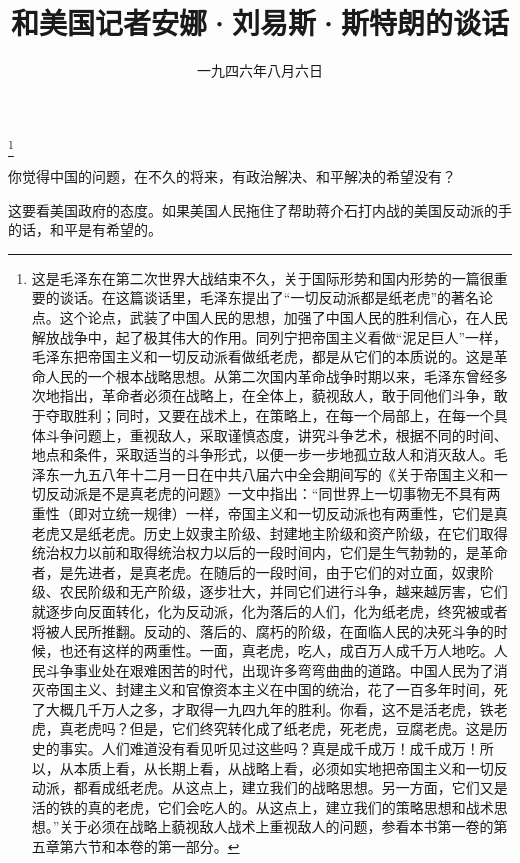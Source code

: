 
\title{和美国记者安娜·刘易斯·斯特朗的谈话}
\date{一九四六年八月六日}
\thanks{这是毛泽东在第二次世界大战结束不久，关于国际形势和国内形势的一篇很重要的谈话。在这篇谈话里，毛泽东提出了“一切反动派都是纸老虎”的著名论点。这个论点，武装了中国人民的思想，加强了中国人民的胜利信心，在人民解放战争中，起了极其伟大的作用。同列宁把帝国主义看做“泥足巨人”一样，毛泽东把帝国主义和一切反动派看做纸老虎，都是从它们的本质说的。这是革命人民的一个根本战略思想。从第二次国内革命战争时期以来，毛泽东曾经多次地指出，革命者必须在战略上，在全体上，藐视敌人，敢于同他们斗争，敢于夺取胜利；同时，又要在战术上，在策略上，在每一个局部上，在每一个具体斗争问题上，重视敌人，采取谨慎态度，讲究斗争艺术，根据不同的时间、地点和条件，采取适当的斗争形式，以便一步一步地孤立敌人和消灭敌人。毛泽东一九五八年十二月一日在中共八届六中全会期间写的《关于帝国主义和一切反动派是不是真老虎的问题》一文中指出：“同世界上一切事物无不具有两重性（即对立统一规律）一样，帝国主义和一切反动派也有两重性，它们是真老虎又是纸老虎。历史上奴隶主阶级、封建地主阶级和资产阶级，在它们取得统治权力以前和取得统治权力以后的一段时间内，它们是生气勃勃的，是革命者，是先进者，是真老虎。在随后的一段时间，由于它们的对立面，奴隶阶级、农民阶级和无产阶级，逐步壮大，并同它们进行斗争，越来越厉害，它们就逐步向反面转化，化为反动派，化为落后的人们，化为纸老虎，终究被或者将被人民所推翻。反动的、落后的、腐朽的阶级，在面临人民的决死斗争的时候，也还有这样的两重性。一面，真老虎，吃人，成百万人成千万人地吃。人民斗争事业处在艰难困苦的时代，出现许多弯弯曲曲的道路。中国人民为了消灭帝国主义、封建主义和官僚资本主义在中国的统治，花了一百多年时间，死了大概几千万人之多，才取得一九四九年的胜利。你看，这不是活老虎，铁老虎，真老虎吗？但是，它们终究转化成了纸老虎，死老虎，豆腐老虎。这是历史的事实。人们难道没有看见听见过这些吗？真是成千成万！成千成万！所以，从本质上看，从长期上看，从战略上看，必须如实地把帝国主义和一切反动派，都看成纸老虎。从这点上，建立我们的战略思想。另一方面，它们又是活的铁的真的老虎，它们会吃人的。从这点上，建立我们的策略思想和战术思想。”关于必须在战略上藐视敌人战术上重视敌人的问题，参看本书第一卷的第五章第六节和本卷的第一部分。}
\maketitle


你觉得中国的问题，在不久的将来，有政治解决、和平解决的希望没有？

这要看美国政府的态度。如果美国人民拖住了帮助蒋介石打内战的美国反动派的手的话，和平是有希望的。

